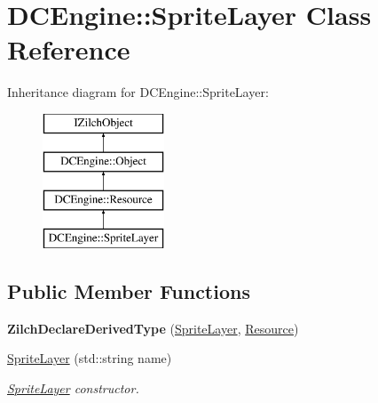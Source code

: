 \hypertarget{classDCEngine_1_1SpriteLayer}{\section{D\-C\-Engine\-:\-:Sprite\-Layer Class Reference}
\label{classDCEngine_1_1SpriteLayer}
}
Inheritance diagram for D\-C\-Engine\-:\-:Sprite\-Layer\-:\begin{figure}[H]
\begin{center}
\leavevmode
\includegraphics[height=4.000000cm]{classDCEngine_1_1SpriteLayer}
\end{center}
\end{figure}
\subsection*{Public Member Functions}
\begin{DoxyCompactItemize}
\item 
\hypertarget{classDCEngine_1_1SpriteLayer_af9195e52c8c99a84125156a9010b6baa}{{\bfseries Zilch\-Declare\-Derived\-Type} (\hyperlink{classDCEngine_1_1SpriteLayer}{Sprite\-Layer}, \hyperlink{classDCEngine_1_1Resource}{Resource})}\label{classDCEngine_1_1SpriteLayer_af9195e52c8c99a84125156a9010b6baa}

\item 
\hypertarget{classDCEngine_1_1SpriteLayer_a31b0b153ca85ea36c006f8cfc0f7399d}{\hyperlink{classDCEngine_1_1SpriteLayer_a31b0b153ca85ea36c006f8cfc0f7399d}{Sprite\-Layer} (std\-::string name)}\label{classDCEngine_1_1SpriteLayer_a31b0b153ca85ea36c006f8cfc0f7399d}

\begin{DoxyCompactList}\small\item\em \hyperlink{classDCEngine_1_1SpriteLayer}{Sprite\-Layer} constructor. \end{DoxyCompactList}\end{DoxyCompactItemize}
